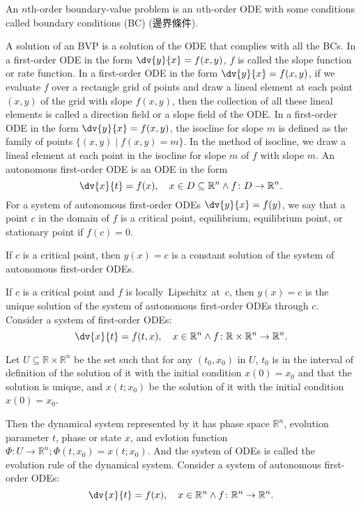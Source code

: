 \documentclass[a4paper,12pt]{report}
\begin{document}
{{{{{{{{{{{{{{{{{
An $n$th-order boundary-value problem is an $n$th-order ODE with some conditions called boundary conditions (BC) (邊界條件).

A solution of an BVP is a solution of the ODE that complies with all the BCs.
In a first-order ODE in the form $\dv{y}{x}=f(x,y)$, $f$ is called the slope function or rate function.
In a first-order ODE in the form $\dv{y}{x}=f(x,y)$, if we evaluate $f$ over a rectangle grid of points and draw a lineal element at each point $(x,y)$ of the grid with slope $f(x,y)$, then the collection of all these lineal elements is called a direction field or a slope field of the ODE.
In a first-order ODE in the form $\dv{y}{x}=f(x,y)$, the isocline for slope $m$ is defined as the family of points $\{(x,y)\mid f(x,y)=m\}$. In the method of isocline, we draw a lineal element at each point in the isocline for slope $m$ of $f$ with slope $m$.
An autonomous first-order ODE is an ODE in the form 
\[\dv{x}{t}=f(x),\quad x\in D\subseteq\mathbb{R}^n\land f\colon D\to\mathbb{R}^n.\]
For a system of autonomous first-order ODEs $\dv{y}{x}=f(y)$, we say that a point $c$ in the domain of $f$ is a critical point, equilibrium, equilibrium point, or stationary point if $f(c)=0$.

If $c$ is a critical point, then $y(x)=c$ is a constant solution of the system of autonomous first-order ODEs.

If $c$ is a critical point and $f$ is locally Lipschitz at $c$, then $y(x)=c$ is the unique solution of the system of autonomous first-order ODEs through $c$.
Consider a system of first-order ODEs:
\[\dv{x}{t}=f(t,x), \quad x\in\mathbb{R}^n\land f\colon\mathbb{R}\times\mathbb{R}^n\to\mathbb{R}^n.\]

Let $U\subseteq\mathbb{R}\times\mathbb{R}^n$ be the set such that for any $(t_0,x_0)$ in $U$, $t_0$ is in the interval of definition of the solution of it with the initial condition $x(0)=x_0$ and that the solution is unique, and $x(t;x_0)$ be the solution of it with the initial condition $x(0)=x_0$.

Then the dynamical system represented by it has phase space $\mathbb{R}^n$, evolution parameter $t$, phase or state $x$, and evlotion function $\Phi\colon U\to\mathbb{R}^n;\Phi(t,x_0)=x(t;x_0)$. And the system of ODEs is called the evolution rule of the dynamical system.
Consider a system of autonomous first-order ODEs:
\[\dv{x}{t}=f(x), \quad x\in\mathbb{R}^n\land f\colon\mathbb{R}^n\to\mathbb{R}^n.\]

}}}}}}}}}}}}}}}}}
\end{document}
